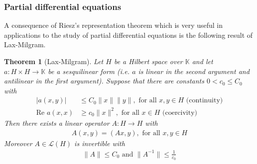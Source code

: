 \documentclass[11pt,a4paper]{article}
\newtheorem{thm}{Theorem}[section]
\theoremstyle{definition}
\begin{document}
\subsubsection{Partial differential equations}
A consequence of Riesz's representation theorem which is very useful in applications to the study of partial differential equations is the following result of Lax-Milgram.
\begin{thm}[Lax-Milgram] Let $H$ be a Hilbert space over $\mathbb{K}$ and let $a: H \times H \to \mathbb{K}$ be a sesquilinear form (i.e. $a$ is linear in the second argument and antilinear in the first argument). Suppose that there are constants $0 < c_0 \leq C_0$ with 
\begin{align*}
|a(x,y)| &\leq C_0 \| x \| \|y \|, \text{ for all } x,y \in H \text{ (continuity)} \\
\text{Re } a(x,x) &\geq c_0 \|x\|^2, \text{ for all } x \in H \text{ (coercivity)} 
\end{align*}
Then there exists a linear operator $A: H \to H$ with
\begin{align*}
A(x,y) = (Ax,y), \text{ for all } x,y \in H
\end{align*}
Moreover $A \in \mathcal{L}(H)$ is invertible with 
\begin{align*}
\|A\| \leq C_0 \text{ and } \|A^{-1} \| \leq \frac{1}{c_0}
\end{align*}
\end{thm}
\end{document}
